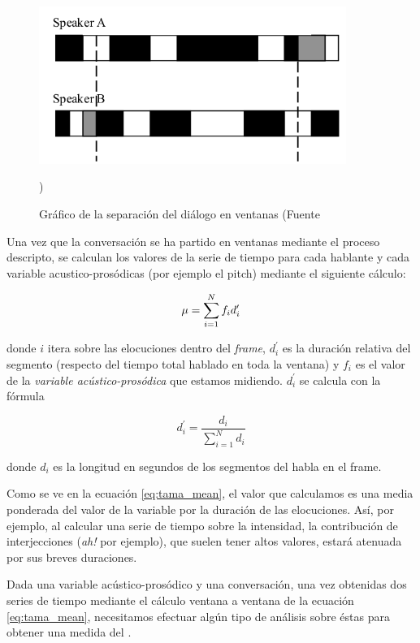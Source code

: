 \begin{figure}[h!]
\centering
\includegraphics[width=10cm]{images/tama.png}
\caption{Gráfico de la separación del diálogo en ventanas (Fuente \cite{KOU2008.2}})
\label{tama}
\end{figure}

Una vez que la conversación se ha partido en ventanas mediante el proceso descripto, se calculan los valores de la serie de tiempo para cada hablante y cada variable acustico-prosódicas (por ejemplo el pitch) mediante el siguiente cálculo:

\begin{equation}
    \mu = \sum\limits_{i=1}^N f_i d_i^\prime \label{eq:tama_mean}\\
\end{equation}

\noindent donde $i$ itera sobre las elocuciones dentro del \emph{frame}, $d_i^\prime$ es la duración relativa del segmento (respecto del tiempo total hablado en toda la ventana) y $f_i$ es el valor de la \emph{variable acústico-prosódica} que estamos midiendo. $d_i^\prime$ se calcula con la fórmula

\begin{equation}
d_i^\prime = \frac{d_i}{\sum\limits_{i=1}^N d_i}
\end{equation}

\noindent donde $d_i$ es la longitud en segundos de los segmentos del habla en el frame.

Como se ve en la ecuación \ref{eq:tama_mean}, el valor que calculamos es una media ponderada del valor de la variable por la duración de las elocuciones. Así, por ejemplo, al calcular una serie de tiempo sobre la intensidad, la contribución de interjecciones (\emph{ah!} por ejemplo), que suelen tener altos valores, estará atenuada por sus breves duraciones.

Dada una variable acústico-prosódico y una conversación, una vez obtenidas  dos series de tiempo mediante el cálculo ventana a ventana de la ecuación \ref{eq:tama_mean}, necesitamos efectuar algún tipo de análisis sobre éstas para obtener una medida del \entrainment.
